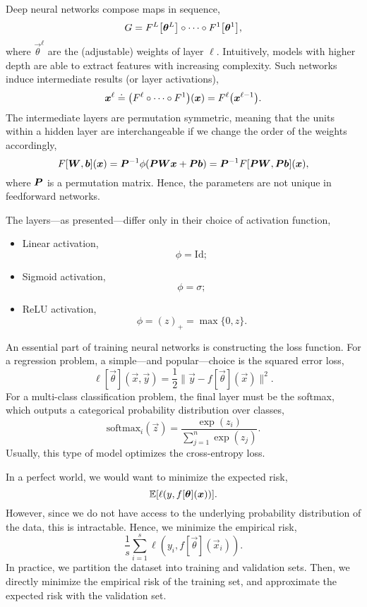 Deep neural networks compose maps in sequence, \[
    G = F^L\lft[ \vec{\theta}^L \rgt] \circ \cdots \circ F^1 \lft[ \vec{\theta}^1 \rgt],
\]
where $\vec{\theta}^{\ell}$ are the (adjustable) weights of layer $\ell$. Intuitively, models with
higher depth are able to extract features with increasing complexity. Such networks induce
intermediate results (or layer activations), \[
    \vec{x}^{\ell} \doteq \lft( F^{\ell} \circ \cdots \circ F^{1} \rgt)(\vec{x}) = F^{\ell}\lft( \vec{x}^{\ell-1} \rgt).
\]
The intermediate layers are permutation symmetric, meaning that the units within a hidden layer are
interchangeable if we change the order of the weights accordingly, \[
    F[\bm{W}, \bm{b}](\bm{x}) = \bm{P}^{-1} \phi(\bm{P}\bm{W}\bm{x} + \bm{P}\bm{b}) = \bm{P}^{-1} F[\bm{P}\bm{W},\bm{P}\bm{b}](\bm{x}),
\]
where $\bm{P}$ is a permutation matrix. Hence, the parameters are not unique in feedforward networks.

The layers---as presented---differ only in their choice of activation function,
\begin{itemize}
    \item Linear activation, \[
              \phi = \mathrm{Id};
          \]
    \item Sigmoid activation, \[
              \phi = \sigma;
          \]
    \item ReLU activation, \[
              \phi = (z)_+ = \max \{ 0, z \}.
          \]
\end{itemize}

An essential part of training neural networks is constructing the loss function. For a regression
problem, a simple---and popular---choice is the squared error loss, \[
    \ell[\vec{\theta}](\vec{x}, \vec{y}) = \frac{1}{2} \| \vec{y} - f[\vec{\theta}](\vec{x}) \|^2.
\]
For a multi-class classification problem, the final layer must be the softmax, which outputs a
categorical probability distribution over classes, \[
    \mathrm{softmax}_i(\vec{z}) = \frac{\exp(z_i)}{\sum_{j=1}^{n} \exp(z_j)}.
\]
Usually, this type of model optimizes the cross-entropy loss.

In a perfect world, we would want to minimize the expected risk, \[
    \mathbb{E}[\ell(y, f[\bm{\theta}](\bm{x}))].
\]
However, since we do not have access to the underlying probability distribution of the data, this
is intractable. Hence, we minimize the empirical risk, \[
    \frac{1}{s} \sum_{i=1}^{s} \ell(y_i, f[\vec{\theta}](\vec{x}_i)).
\]
In practice, we partition the dataset into training and validation sets. Then, we directly minimize
the empirical risk of the training set, and approximate the expected risk with the validation set.

